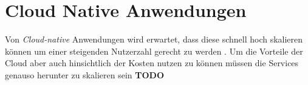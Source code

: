 \section{Cloud Native Anwendungen}


Von \textit{Cloud-native} Anwendungen wird erwartet, dass diese schnell hoch skalieren können um einer steigenden Nutzerzahl gerecht zu werden \cite[Vgl.][S. 1ff]{Armbrust2009} \cite[Vgl.][S. 234]{Villamizar2017}. Um die Vorteile der Cloud aber auch hinsichtlich der Kosten nutzen zu können müssen die Services genauso herunter zu skalieren sein \cite[Vgl.][S. 884]{Adzic2017} \textbf{TODO} \pagebreak